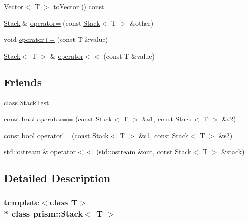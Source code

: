 \begin{DoxyCompactItemize}
\item 
\hyperlink{classprism_1_1_vector}{Vector}$<$ T $>$ \hyperlink{classprism_1_1_stack_ac373a993c993bbf07a485a2838c9cae9}{to\+Vector} () const 
\item 
\hyperlink{classprism_1_1_stack}{Stack} \& \hyperlink{classprism_1_1_stack_ae1ff12e8acc61bc0cd9434e03c36c171}{operator=} (const \hyperlink{classprism_1_1_stack}{Stack}$<$ T $>$ \&other)
\item 
void \hyperlink{classprism_1_1_stack_a6a8ec445b5503fdc5e3358dd1b100a9c}{operator+=} (const T \&value)
\item 
\hyperlink{classprism_1_1_stack}{Stack}$<$ T $>$ \& \hyperlink{classprism_1_1_stack_a6b19a970604a4edc6cccbb61f226e9e9}{operator$<$$<$} (const T \&value)
\end{DoxyCompactItemize}
\subsection*{Friends}
\begin{DoxyCompactItemize}
\item 
class \hyperlink{classprism_1_1_stack_a660ffbd70515df798aa6fe2edafb3156}{Stack\+Test}
\item 
const bool \hyperlink{classprism_1_1_stack_aeb1f035d92d81418856c1f1c1bec54b3}{operator==} (const \hyperlink{classprism_1_1_stack}{Stack}$<$ T $>$ \&s1, const \hyperlink{classprism_1_1_stack}{Stack}$<$ T $>$ \&s2)
\item 
const bool \hyperlink{classprism_1_1_stack_aa79914f1e49ebf8bd569580a2113326d}{operator!=} (const \hyperlink{classprism_1_1_stack}{Stack}$<$ T $>$ \&s1, const \hyperlink{classprism_1_1_stack}{Stack}$<$ T $>$ \&s2)
\item 
std\+::ostream \& \hyperlink{classprism_1_1_stack_a7e1f9c28a318f010223ea59ac3d3733a}{operator$<$$<$} (std\+::ostream \&out, const \hyperlink{classprism_1_1_stack}{Stack}$<$ T $>$ \&stack)
\end{DoxyCompactItemize}


\subsection{Detailed Description}
\subsubsection*{template$<$class T$>$\\*
class prism\+::\+Stack$<$ T $>$}

